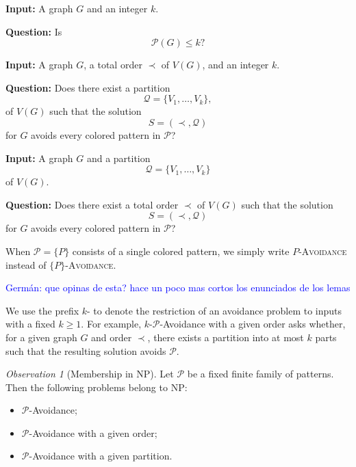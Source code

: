 \documentclass[12pt]{article}
\theoremstyle{plain}
\theoremstyle{definition}
\theoremstyle{remark}
\newtheorem{observation}[theorem]{Observation}
\theoremstyle{definition}
\newcommand{\german}[1]{%
  \textcolor{blue}{Germán: #1}%
}
\begin{document}
\begin{problem}
\textbf{Input:} A graph \(G\) and an integer \(k\).

\textbf{Question:} Is
\[
\mathcal P(G)\le k?
\]
\end{problem}



\begin{problem}
\textbf{Input:} A graph \(G\), a total order \(\prec\) of \(V(G)\), and an integer \(k\).

\textbf{Question:} Does there exist a partition
\[
\mathcal Q=\{V_1,\dots,V_k\},
\]
of \(V(G)\)
such that the solution
\[
S=(\prec,\mathcal Q)
\]
for \(G\) avoids every colored pattern in \(\mathcal P\)?
\end{problem}



\begin{problem}
\textbf{Input:} A graph \(G\) and a partition
\[
\mathcal Q=\{V_1,\dots,V_k\}
\]
of \(V(G)\).

\textbf{Question:} Does there exist a total order \(\prec\) of \(V(G)\) such that the solution
\[
S=(\prec,\mathcal Q)
\]
for \(G\) avoids every colored pattern in \(\mathcal P\)?
\end{problem}

When \(\mathcal P=\{P\}\) consists of a single colored pattern, we simply write \textsc{\(P\)-Avoidance} instead of
\textsc{\(\{P\}\)-Avoidance}.

\german{que opinas de esta? hace un poco mas cortos los enunciados de los lemas}
We use the prefix \(k\)- to denote the
restriction of an avoidance problem to inputs with a fixed \(k\ge1\).
For example, \(k\)-\(\mathcal P\)-Avoidance with a given order asks whether,
for a given graph \(G\) and order \(\prec\), there exists a partition into at
most \(k\) parts such that the resulting solution avoids \(\mathcal P\).

\begin{observation}[Membership in NP]
\label{obs:avoidance-in-NP}
Let \(\mathcal P\) be a fixed finite family of patterns. Then the following
problems belong to \(\mathrm{NP}\):
\begin{itemize}
    \item \(\mathcal P\)-Avoidance;
    \item \(\mathcal P\)-Avoidance with a given order;
    \item \(\mathcal P\)-Avoidance with a given partition.
\end{itemize}
\end{observation}
\end{document}
